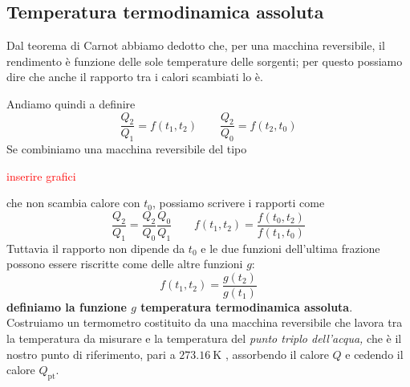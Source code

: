 \documentclass[x11names]{report}
\begin{document}
	
	\subsection{Temperatura termodinamica assoluta}
	Dal teorema di Carnot abbiamo dedotto che, per una macchina reversibile, il rendimento è funzione delle sole temperature delle sorgenti; per questo possiamo dire che anche il rapporto tra i calori scambiati lo è. 
	
	Andiamo quindi a definire 
	\[ 
	\frac{Q_{2}}{Q_{1}} = f(t_{1},t_{2}) \qquad \frac{Q_{2}}{Q_{0}} = f(t_{2},t_{0}) 
	\]
	Se combiniamo una macchina reversibile del tipo
	\begin{center}
		\textcolor{red}{inserire grafici}
	\end{center}
	che non scambia calore con \(t_{0}\), possiamo scrivere i rapporti come
	\[ 
	\frac{Q_{2}}{Q_{1}} = \frac{Q_{2}}{Q_{0}}\frac{Q_{0}}{Q_{1}} \qquad f(t_{1},t_{2}) = \frac{f(t_{0},t_{2})}{f(t_{1},t_{0})}
	\]
	Tuttavia il rapporto non dipende da \(t_{0}\) e le due funzioni dell'ultima frazione possono essere riscritte come delle altre funzioni \(g\):
	\[ 
	f(t_{1},t_{2}) = \frac{g(t_{2})}{g(t_{1})}
	\]
	\textbf{definiamo la funzione \(g\) temperatura termodinamica assoluta}. \\
	
	\noindent
	Costruiamo un termometro costituito da una macchina reversibile che lavora tra la temperatura da misurare e la temperatura del \textit{punto triplo dell'acqua,} che è il nostro punto di riferimento, pari a \(\SI{273.16}{\kelvin}\) , assorbendo il calore \(Q\) e cedendo il calore \(Q _{\text{pt}}\).
	
\end{document}
